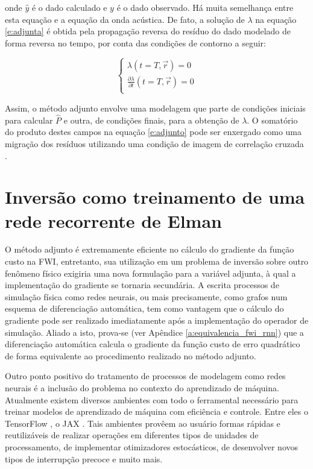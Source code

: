     \noindent onde $\hat{y}$ é o dado calculado e $y$ é o dado observado. Há muita semelhança entre esta equação e a equação da onda acústica. De fato, a solução de $\lambda$ na equação \ref{e:adjunta} é obtida pela propagação reversa do resíduo do dado modelado de forma reversa no tempo, por conta das condições de contorno a seguir:

    \begin{equation} \label{e:adjunta_condicoes}
      \begin{cases}
        \lambda(t=T,\vec{r}) = 0\\
        \frac{\partial \lambda}{\partial t}(t=T,\vec{r}) = 0\\
      \end{cases}
    \end{equation}

    Assim, o método adjunto envolve uma modelagem que parte de condições iniciais para calcular $\hat{P}$ e outra, de condições finais, para a obtenção de $\lambda$. O somatório do produto destes campos na equação \ref{e:adjunto} pode ser enxergado como uma migração dos resíduos utilizando uma condição de imagem de correlação cruzada \DIFdelbegin {}\DIFdelend \DIFaddbegin {}\DIFaddend .


  \section{Inversão como treinamento de uma rede recorrente de Elman}

    O método adjunto é extremamente eficiente no cálculo do gradiente da função custo na FWI, entretanto, sua utilização em um problema de inversão sobre outro fenômeno físico exigiria uma nova formulação para a variável adjunta, à qual a implementação do gradiente se tornaria secundária. A escrita processos de simulação física como redes neurais, ou mais precisamente, como grafos num esquema de diferenciação automática, tem como vantagem que o cálculo do gradiente pode ser realizado imediatamente após a implementação do operador de simulação. Aliado a isto, prova-se (ver Apêndice \ref{a:equivalencia_fwi_rnn}) que a diferenciação automática calcula o gradiente da função custo de erro quadrático de forma equivalente ao procedimento realizado no método adjunto.

    Outro ponto positivo do tratamento de processos de modelagem como redes neurais é a inclusão do problema no contexto do aprendizado de máquina. Atualmente existem diversos ambientes com todo o ferramental necessário para treinar modelos de aprendizado de máquina com eficiência e controle. Entre eles o TensorFlow , o JAX . Tais ambientes provêem ao usuário formas rápidas e reutilizáveis de realizar operações em diferentes tipos de unidades de processamento, de implementar otimizadores estocásticos, de desenvolver novos tipos de interrupção precoce e muito mais.

